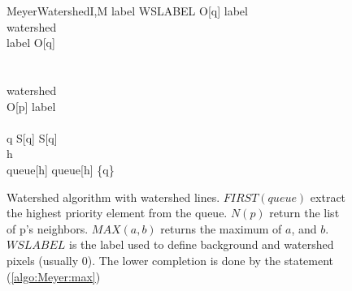 \documentclass{InsightArticle}
\begin{document}
\begin{figure}[htbp]
\begin{pseudocode}[framebox]{MeyerWatershed}{I,M}
      \THEN
        \BEGIN
        \IF label \neq WSLABEL \AND O[q] \neq label \\
        \THEN
          watershed \GETS \TRUE \\
        \ELSE
          label \GETS O[q] \\
        \END
    \END \\
     \\
    \IF \neg watershed
    \THEN
      \BEGIN
         \\
        O[p] \GETS label \\
         \\
        \FOREACH q \in {} \DO
        \BEGIN
          \IF \neg S[q]
          \THEN
            \BEGIN
            S[q] \GETS \TRUE \\
            h \GETS {}  \\
            queue[h] \GETS queue[h] \cup \{q\} \\
            \END
        \END
      \END
  \END
\END
\end{pseudocode}
\caption{Watershed algorithm with watershed lines.\label{MeyerAlgorithm} $FIRST(queue)$ extract the highest priority element from the queue. $N(p)$ return the list of p's neighbors. $MAX(a,b)$ returns the maximum of $a$, and $b$. $WSLABEL$ is the label used to define background and watershed pixels (usually $0$). The lower completion is done by the statement (\ref{algo:Meyer:max})}
\end{figure}




% 	
% 
% 
%  
% 
% 	
% 
%         
\end{document}
